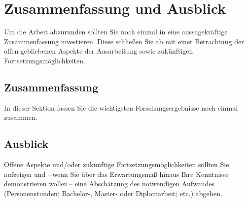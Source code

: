\chapter{Zusammenfassung und Ausblick}\label{chap:Conclusion}
Um die Arbeit abzurunden sollten Sie noch einmal in eine aussagekräftige Zusammenfassung investieren. Diese schließen Sie ab mit einer Betrachtung der offen gebliebenen Aspekte der Ausarbeitung sowie zukünftigen Fortsetzungsmöglichkeiten.

\section{Zusammenfassung}\label{sec:Conclusion:Summary}
In dieser Sektion fassen Sie die wichtigsten Forschungsergebnisse noch einmal zusammen. 

\section{Ausblick}\label{sec:Conclusion:FutureWork}
Offene Aspekte und/oder zukünftige Fortsetzungsmöglichkeiten sollten Sie aufzeigen und --\,wenn Sie über das Erwartungsmaß hinaus Ihre Kenntnisse demonstrieren wollen\,-- eine Abschätzung des notwendigen Aufwandes (Personenstunden; Bachelor-, Master- oder Diplomarbeit; etc.) abgeben.

%
\label{contentPages:End}